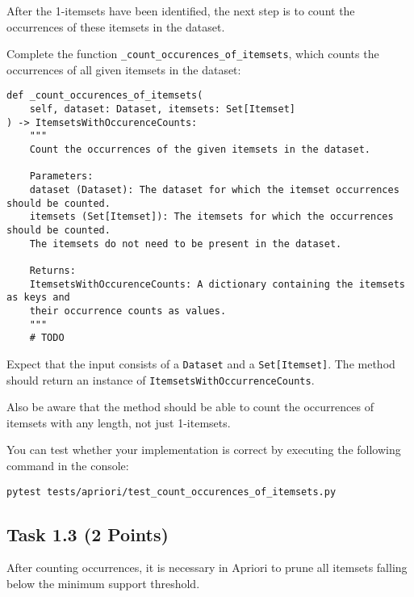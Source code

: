 \documentclass[
english,
smallborders
]{i6prcsht}
\newcommand{\points}[1]{\hfill \color{red}(#1 Points)\color{black}}
\begin{document}
After the 1-itemsets have been identified, the next step is to count the occurrences of these itemsets in the dataset.

Complete the function \texttt{\_count\_occurences\_of\_itemsets}, which counts the occurrences of all given itemsets in the dataset:

\vspace*{0.3cm}

\begin{lstlisting}
def _count_occurences_of_itemsets(
	self, dataset: Dataset, itemsets: Set[Itemset]
) -> ItemsetsWithOccurenceCounts:
	"""
    Count the occurrences of the given itemsets in the dataset.

	Parameters:
	dataset (Dataset): The dataset for which the itemset occurrences should be counted.
	itemsets (Set[Itemset]): The itemsets for which the occurrences should be counted.
	The itemsets do not need to be present in the dataset.

	Returns:
	ItemsetsWithOccurenceCounts: A dictionary containing the itemsets as keys and
	their occurrence counts as values.
	"""
	# TODO
\end{lstlisting}

\vspace*{0.1cm}

Expect that the input consists of a \texttt{Dataset} and a \texttt{Set[Itemset]}. The method should return an instance of \texttt{ItemsetsWithOccurrenceCounts}.

Also be aware that the method should be able to count the occurrences of itemsets with any length, not just 1-itemsets.

You can test whether your implementation is correct by executing the following command in the console:

\vspace*{0.3cm}

\begin{lstlisting}
pytest tests/apriori/test_count_occurences_of_itemsets.py
\end{lstlisting}

\vspace*{0.1cm}

\subsection*{Task 1.3 \points{2}}

After counting occurrences, it is necessary in Apriori to prune all itemsets falling below the minimum support threshold.
\end{document}
